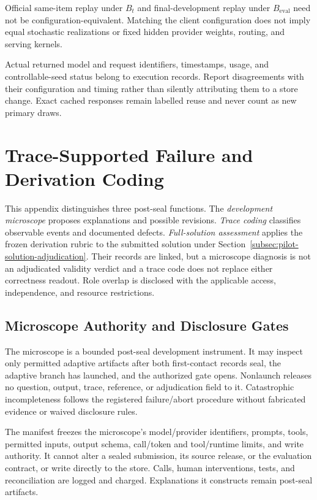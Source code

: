 \documentclass[10pt]{article} %
\providecommand{\1}{\mathbf{1}}  %
\theoremstyle{remark}
\theoremstyle{definition}
\begin{document}
Official same-item replay under $B_t$ and final-development replay under
$B_{\mathrm{eval}}$ need not be configuration-equivalent. Matching the
client configuration does not imply equal stochastic realizations or fixed
hidden provider weights, routing, and serving kernels.

Actual returned model and request identifiers, timestamps, usage, and
controllable-seed status belong to execution records. Report disagreements
with their configuration and timing rather than silently attributing them to a store change. Exact cached
responses remain labelled reuse and never count as new primary draws.

\section{Trace-Supported Failure and Derivation Coding}
\label{app:audit-microscopes}

This appendix distinguishes three post-seal functions. The
\emph{development microscope} proposes explanations and possible
revisions. \emph{Trace coding} classifies observable events and
documented defects. \emph{Full-solution assessment} applies the
frozen derivation rubric to the submitted solution under
Section~\ref{subsec:pilot-solution-adjudication}. Their records are
linked, but a microscope diagnosis is not an adjudicated validity
verdict and a trace code does not replace either correctness
readout. Role overlap is disclosed with the applicable access,
independence, and resource restrictions.

\subsection{Microscope Authority and Disclosure Gates}
\label{subsec:audit-authority}

The microscope is a bounded post-seal development instrument. It may inspect
only permitted adaptive artifacts after both first-contact records seal,
the adaptive branch has launched, and the authorized gate opens. Nonlaunch
releases no question, output, trace, reference, or adjudication field to it.
Catastrophic incompleteness follows the registered failure/abort procedure
without fabricated evidence or waived disclosure rules.

The manifest freezes the microscope's model/provider identifiers, prompts,
tools, permitted inputs, output schema, call/token and tool/runtime limits,
and write authority. It cannot alter a sealed submission, its source release,
or the evaluation contract, or write directly to the store. Calls, human
interventions, tests, and reconciliation are logged and charged. Explanations
it constructs remain post-seal artifacts.
\end{document}
